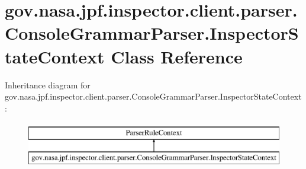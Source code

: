 \hypertarget{classgov_1_1nasa_1_1jpf_1_1inspector_1_1client_1_1parser_1_1_console_grammar_parser_1_1_inspector_state_context}{}\section{gov.\+nasa.\+jpf.\+inspector.\+client.\+parser.\+Console\+Grammar\+Parser.\+Inspector\+State\+Context Class Reference}
\label{classgov_1_1nasa_1_1jpf_1_1inspector_1_1client_1_1parser_1_1_console_grammar_parser_1_1_inspector_state_context}
Inheritance diagram for gov.\+nasa.\+jpf.\+inspector.\+client.\+parser.\+Console\+Grammar\+Parser.\+Inspector\+State\+Context\+:\begin{figure}[H]
\begin{center}
\leavevmode
\includegraphics[height=2.000000cm]{classgov_1_1nasa_1_1jpf_1_1inspector_1_1client_1_1parser_1_1_console_grammar_parser_1_1_inspector_state_context}
\end{center}
\end{figure}
